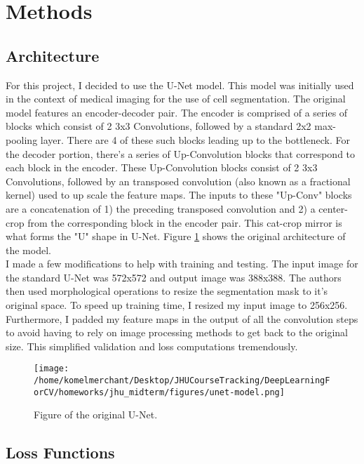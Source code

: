 \documentclass[Location Location Location! : Exploring Image Segmentation Problem In Urban Driving Scenarios]{IEEEtran}
\begin{document}
\section{Methods}

\subsection{Architecture}
For this project, I decided to use the U-Net model. This model was initially used in the context of medical imaging for the use of cell segmentation. The original model features an encoder-decoder pair. The encoder is comprised of a series of blocks which consist of 2 3x3 Convolutions, followed by a standard 2x2 max-pooling layer. There are 4 of these such blocks leading up to the bottleneck. For the decoder portion, there's a series of Up-Convolution blocks that correspond to each block in the encoder. These Up-Convolution blocks consist of 2 3x3 Convolutions, followed by an transposed convolution (also known as a fractional kernel) used to up scale the feature maps. The inputs to these "Up-Conv" blocks are a concatenation of 1) the preceding transposed convolution and 2) a center-crop from the corresponding block in the encoder pair. This cat-crop mirror is what forms the "U" shape in U-Net. Figure \ref{unet} shows the original architecture of the model. \\  

I made a few modifications to help with training and testing. The input image for the standard U-Net was 572x572 and output image was 388x388. The authors then used morphological operations to resize the segmentation mask to it's original space. To speed up training time, I resized my input image to 256x256. Furthermore, I padded my feature maps in the output of all the convolution steps to avoid having to rely on image processing methods to get back to the original size. This simplified validation and loss computations tremendously. 


\begin{figure}[htbp]
\centerline{\texttt{[image: /home/komelmerchant/Desktop/JHUCourseTracking/DeepLearningForCV/homeworks/jhu\_midterm/figures/unet-model.png]}}
\caption{Figure of the original U-Net.}
\label{unet}
\end{figure}


\subsection{Loss Functions}
\end{document}
